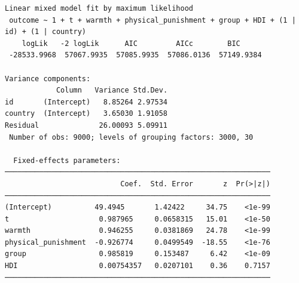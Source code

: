 \documentclass[
  letterpaper,
  DIV=11,
  numbers=noendperiod,
  oneside]{scrreprt}
\begin{document}
\begin{verbatim}
Linear mixed model fit by maximum likelihood
 outcome ~ 1 + t + warmth + physical_punishment + group + HDI + (1 | id) + (1 | country)
    logLik   -2 logLik      AIC         AICc        BIC     
 -28533.9968  57067.9935  57085.9935  57086.0136  57149.9384

Variance components:
            Column   Variance Std.Dev.
id       (Intercept)   8.85264 2.97534
country  (Intercept)   3.65030 1.91058
Residual              26.00093 5.09911
 Number of obs: 9000; levels of grouping factors: 3000, 30

  Fixed-effects parameters:
──────────────────────────────────────────────────────────────
                           Coef.  Std. Error       z  Pr(>|z|)
──────────────────────────────────────────────────────────────
(Intercept)          49.4945       1.42422     34.75    <1e-99
t                     0.987965     0.0658315   15.01    <1e-50
warmth                0.946255     0.0381869   24.78    <1e-99
physical_punishment  -0.926774     0.0499549  -18.55    <1e-76
group                 0.985819     0.153487     6.42    <1e-09
HDI                   0.00754357   0.0207101    0.36    0.7157
──────────────────────────────────────────────────────────────
\end{verbatim}
\end{document}
